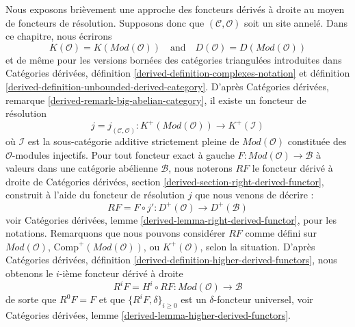 \noindent
Nous exposons brièvement une approche des foncteurs dérivés à droite au moyen
de foncteurs de résolution. Supposons donc que $(\mathcal{C}, \mathcal{O})$ soit un site annelé.
Dans ce chapitre, nous écrirons
$$
K(\mathcal{O}) = K(\textit{Mod}(\mathcal{O}))
\quad
\text{and}
\quad
D(\mathcal{O}) = D(\textit{Mod}(\mathcal{O}))
$$
et de même pour les versions bornées des catégories triangulées
introduites dans
Catégories dérivées, définition \ref{derived-definition-complexes-notation} et
définition \ref{derived-definition-unbounded-derived-category}.
D'après
Catégories dérivées, remarque \ref{derived-remark-big-abelian-category},
il existe un foncteur de résolution
$$
j = j_{(\mathcal{C}, \mathcal{O})} :
K^{+}(\textit{Mod}(\mathcal{O}))
\longrightarrow
K^{+}(\mathcal{I})
$$
où $\mathcal{I}$ est la sous-catégorie additive strictement pleine de
$\textit{Mod}(\mathcal{O})$ constituée des $\mathcal{O}$-modules injectifs.
Pour tout foncteur exact à gauche $F : \textit{Mod}(\mathcal{O}) \to \mathcal{B}$
à valeurs dans une catégorie abélienne $\mathcal{B}$, nous noterons $RF$ le
foncteur dérivé à droite de
Catégories dérivées, section \ref{derived-section-right-derived-functor},
construit à l'aide du foncteur de résolution $j$ que nous venons de décrire :
\begin{equation}
\label{equation-RF}
RF = F \circ j' : D^{+}(\mathcal{O}) \longrightarrow D^{+}(\mathcal{B})
\end{equation}
voir
Catégories dérivées, lemme \ref{derived-lemma-right-derived-functor},
pour les notations. Remarquons que nous pouvons considérer $RF$ comme défini sur
$\textit{Mod}(\mathcal{O})$, $\text{Comp}^{+}(\textit{Mod}(\mathcal{O}))$, ou
$K^{+}(\mathcal{O})$, selon la situation. D'après
Catégories dérivées, définition \ref{derived-definition-higher-derived-functors},
nous obtenons le $i$-ième foncteur dérivé à droite
\begin{equation}
\label{equation-RFi}
R^iF = H^i \circ RF : \textit{Mod}(\mathcal{O}) \longrightarrow \mathcal{B}
\end{equation}
de sorte que $R^0F = F$ et que $\{R^iF, \delta\}_{i \geq 0}$ est un
$\delta$-foncteur universel, voir
Catégories dérivées, lemme \ref{derived-lemma-higher-derived-functors}.

